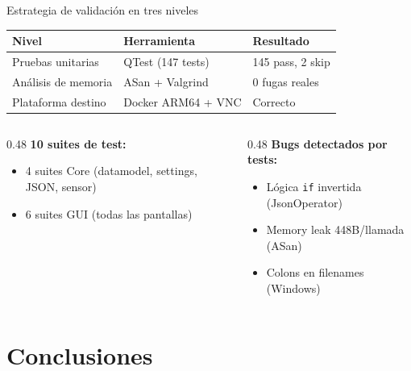 \documentclass[aspectratio=169,11pt]{beamer}
\begin{document}
\begin{frame}{Estrategia de validación en tres niveles}

\begin{table}
\centering
\begin{tabular}{lll}
\toprule
\textbf{Nivel} & \textbf{Herramienta} & \textbf{Resultado} \\
\midrule
Pruebas unitarias & QTest (147 tests) & 145 pass, 2 skip \\
Análisis de memoria & ASan + Valgrind & 0 fugas reales \\
Plataforma destino & Docker ARM64 + VNC & Correcto \\
\bottomrule
\end{tabular}
\end{table}

\vspace{0.5cm}

\begin{columns}[T]
\begin{column}{0.48\textwidth}
\textbf{10 suites de test:}
\begin{itemize}
    \item 4 suites Core (datamodel, settings, JSON, sensor)
    \item 6 suites GUI (todas las pantallas)
\end{itemize}
\end{column}
\begin{column}{0.48\textwidth}
\textbf{Bugs detectados por tests:}
\begin{itemize}
    \item Lógica \texttt{if} invertida (JsonOperator)
    \item Memory leak 448B/llamada (ASan)
    \item Colons en filenames (Windows)
\end{itemize}
\end{column}
\end{columns}

\end{frame}

\section{Conclusiones}
\end{document}
